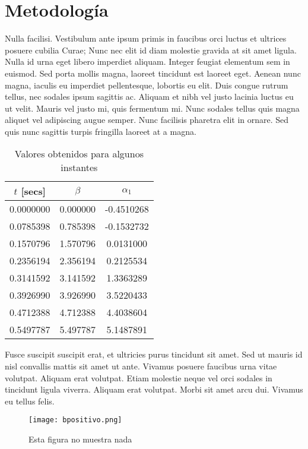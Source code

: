 \documentclass[twocolumn,a4paper,10pt]{article}
\begin{document}
\section{Metodología}
Nulla facilisi. Vestibulum ante ipsum primis in faucibus orci luctus et ultrices posuere cubilia Curae; Nunc nec elit id diam molestie gravida at sit amet ligula. Nulla id urna eget libero imperdiet aliquam. Integer feugiat elementum sem in euismod. Sed porta mollis magna, laoreet tincidunt est laoreet eget. Aenean nunc magna, iaculis eu imperdiet pellentesque, lobortis eu elit. Duis congue rutrum tellus, nec sodales ipsum sagittis ac. Aliquam et nibh vel justo lacinia luctus eu ut velit. Mauris vel justo mi, quis fermentum mi. Nunc sodales tellus quis magna aliquet vel adipiscing augue semper. Nunc facilisis pharetra elit in ornare. Sed quis nunc sagittis turpis fringilla laoreet at a magna.
\begin{table}
    \center
    \begin{tabular}{c|c|c}
            $t$ [secs] & $\beta$ & $\alpha_1$ \\ \hline \hline
       0.0000000  &  0.000000  & -0.4510268 \\
       0.0785398  &  0.785398  & -0.1532732 \\
       0.1570796  &  1.570796  &  0.0131000 \\
       0.2356194  &  2.356194  &  0.2125534 \\
       0.3141592  &  3.141592  &  1.3363289 \\
       0.3926990  &  3.926990  &  3.5220433 \\
       0.4712388  &  4.712388  &  4.4038604 \\
       0.5497787  &  5.497787  &  5.1487891 \\

    \end{tabular}
    \caption{Valores obtenidos para algunos instantes}
    \label{tabla_segundo_punto}
\end{table}

Fusce suscipit suscipit erat, et ultricies purus tincidunt sit amet. Sed ut mauris id nisl convallis mattis sit amet ut ante. Vivamus posuere faucibus urna vitae volutpat. Aliquam erat volutpat. Etiam molestie neque vel orci sodales in tincidunt ligula viverra. Aliquam erat volutpat. Morbi sit amet arcu dui. Vivamus eu tellus felis.

\begin{figure}
    \center \texttt{[image: bpositivo.png]}
    \caption{Esta figura no muestra nada}
\end{figure}
\end{document}
